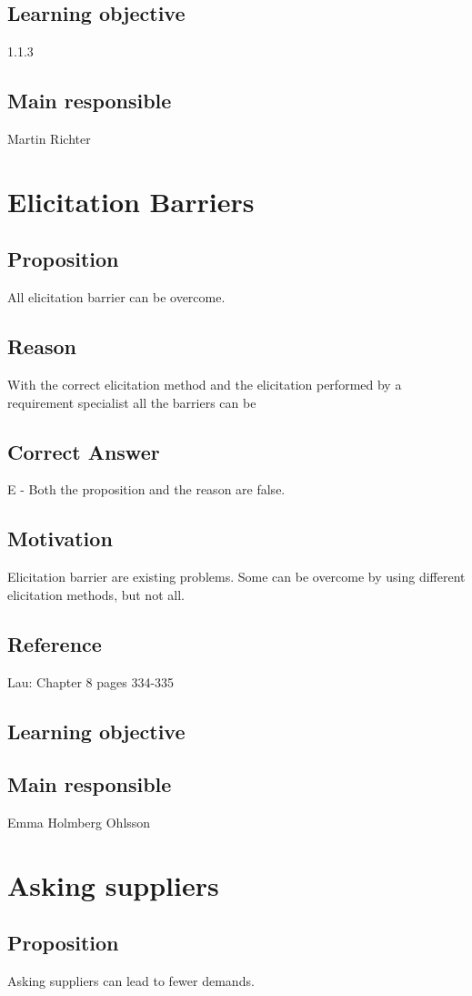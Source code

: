 \documentclass[a4paper]{article}
\begin{document}
\subsection{Learning objective}
1.1.3
\subsection{Main responsible}
Martin Richter


\section{Elicitation Barriers}
\subsection{Proposition}
All elicitation barrier can be overcome.
\subsection{Reason}
With the correct elicitation method and the elicitation performed by a requirement specialist all the barriers can be 
\subsection{Correct Answer}
E - Both the proposition and the reason are false.
\subsection{Motivation}
Elicitation barrier are existing problems. Some can be overcome by using different elicitation methods, but not all.
\subsection{Reference}
Lau: Chapter 8 pages 334-335
\subsection{Learning objective}

\subsection{Main responsible}
Emma Holmberg Ohlsson


\section{Asking suppliers}
\subsection{Proposition}
Asking suppliers can lead to fewer demands.
\end{document}
